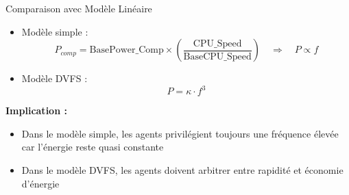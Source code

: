 \documentclass[10pt,aspectratio=169]{beamer}
\begin{document}
\begin{frame}{Comparaison avec Modèle Linéaire}
\begin{itemize}
\item Modèle simple :
\begin{equation}
P_{comp} = \text{BasePower\_Comp} \times \left(\frac{\text{CPU\_Speed}}{\text{BaseCPU\_Speed}}\right) \quad \Rightarrow \quad P \propto f
\end{equation}

\item Modèle DVFS :
\begin{equation}
P = \kappa \cdot f^3
\end{equation}

\end{itemize}

\vspace{0.5cm}

\textbf{Implication :}
\begin{itemize}
\item Dans le modèle simple, les agents privilégient toujours une fréquence élevée car l’énergie reste quasi constante
\item Dans le modèle DVFS, les agents doivent arbitrer entre rapidité et économie d’énergie
\end{itemize}

\end{frame}
\end{document}
